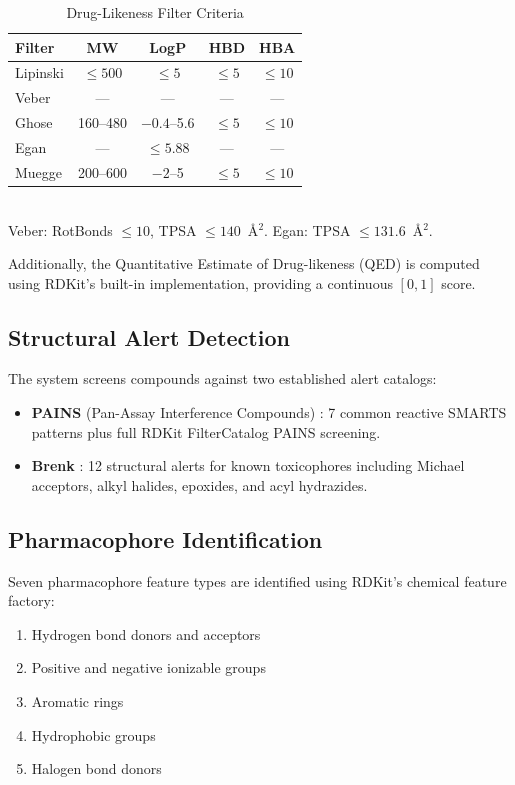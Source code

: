 \documentclass[conference]{IEEEtran}
\begin{document}
\begin{table}[h]
\centering
\caption{Drug-Likeness Filter Criteria}
\label{tab:druglikeness}
\begin{tabular}{@{}lcccc@{}}
\toprule
\textbf{Filter} & \textbf{MW} & \textbf{LogP} & \textbf{HBD} & \textbf{HBA} \\
\midrule
Lipinski \cite{lipinski2001} & $\leq 500$ & $\leq 5$ & $\leq 5$ & $\leq 10$ \\
Veber \cite{veber2002}   & --- & --- & --- & --- \\
Ghose \cite{ghose1999}   & 160--480 & $-0.4$--5.6 & $\leq 5$ & $\leq 10$ \\
Egan \cite{egan2000}     & --- & $\leq 5.88$ & --- & --- \\
Muegge \cite{muegge2001} & 200--600 & $-2$--5 & $\leq 5$ & $\leq 10$ \\
\bottomrule
\end{tabular}
\\[3pt]
\footnotesize{Veber: RotBonds $\leq 10$, TPSA $\leq 140$~\AA$^2$. Egan: TPSA $\leq 131.6$~\AA$^2$.}
\end{table}

Additionally, the Quantitative Estimate of Drug-likeness (QED) \cite{bickerton2012qed} is computed using RDKit's built-in implementation, providing a continuous $[0, 1]$ score.

\subsection{Structural Alert Detection}

The system screens compounds against two established alert catalogs:

\begin{itemize}
    \item \textbf{PAINS} (Pan-Assay Interference Compounds) \cite{baell2010pains}: 7 common reactive SMARTS patterns plus full RDKit FilterCatalog PAINS screening.
    \item \textbf{Brenk} \cite{brenk2008}: 12 structural alerts for known toxicophores including Michael acceptors, alkyl halides, epoxides, and acyl hydrazides.
\end{itemize}

\subsection{Pharmacophore Identification}

Seven pharmacophore feature types are identified using RDKit's chemical feature factory:
\begin{enumerate}
    \item Hydrogen bond donors and acceptors
    \item Positive and negative ionizable groups
    \item Aromatic rings
    \item Hydrophobic groups
    \item Halogen bond donors
\end{enumerate}
\end{document}
